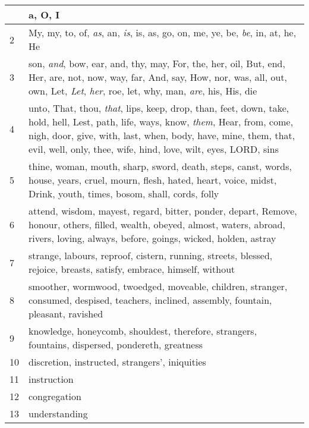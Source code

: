 \begin{center}
\begin{longtable}{l|p{3.75in}}
\hline \hline 
\endlastfoot 
1 & a, O, I\\ \hline 
2 & My, my, to, of, \emph{as}, an, \emph{is}, is, as, go, on, me, ye, be, \emph{be}, in, at, he, He\\ \hline 
3 & son, \emph{and}, bow, ear, and, thy, may, For, the, her, oil, But, end, Her, are, not, now, way, far, And, say, How, nor, was, all, out, own, Let, \emph{Let}, \emph{her}, roe, let, why, man, \emph{are}, his, His, die\\ \hline 
4 & unto, That, thou, \emph{that}, lips, keep, drop, than, feet, down, take, hold, hell, Lest, path, life, ways, know, \emph{them}, Hear, from, come, nigh, door, give, with, last, when, body, have, mine, them, that, evil, well, only, thee, wife, hind, love, wilt, eyes, LORD, sins\\ \hline 
5 & thine, woman, mouth, sharp, sword, death, steps, canst, words, house, years, cruel, mourn, flesh, hated, heart, voice, midst, Drink, youth, times, bosom, shall, cords, folly\\ \hline 
6 & attend, wisdom, mayest, regard, bitter, ponder, depart, Remove, honour, others, filled, wealth, obeyed, almost, waters, abroad, rivers, loving, always, before, goings, wicked, holden, astray\\ \hline 
7 & strange, labours, reproof, cistern, running, streets, blessed, rejoice, breasts, satisfy, embrace, himself, without\\ \hline 
8 & smoother, wormwood, twoedged, moveable, children, stranger, consumed, despised, teachers, inclined, assembly, fountain, pleasant, ravished\\ \hline 
9 & knowledge, honeycomb, shouldest, therefore, strangers, fountains, dispersed, pondereth, greatness\\ \hline 
10 & discretion, instructed, strangers', iniquities\\ \hline 
11 & instruction\\ \hline 
12 & congregation\\ \hline 
13 & understanding\\ \hline 
\end{longtable} 
\end{center} 




 
